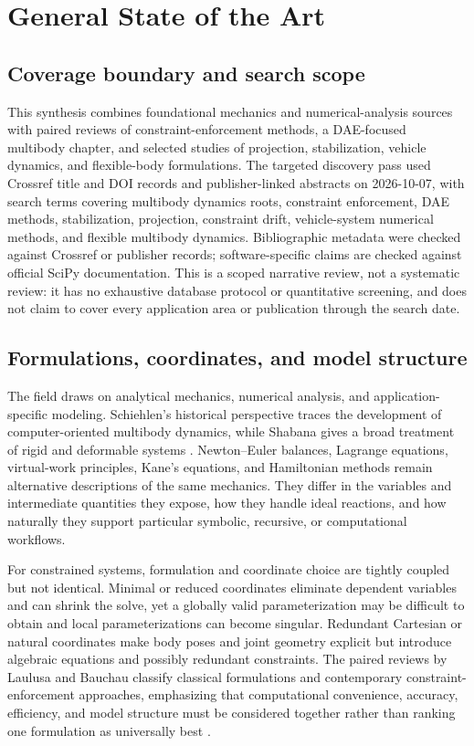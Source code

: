 \chapter*{General State of the Art}

\label{chap:general-state-of-the-art}

\section*{Coverage boundary and search scope}
This synthesis combines foundational mechanics and numerical-analysis sources with paired reviews of constraint-enforcement methods, a DAE-focused multibody chapter, and selected studies of projection, stabilization, vehicle dynamics, and flexible-body formulations. The targeted discovery pass used Crossref title and DOI records and publisher-linked abstracts on 2026-10-07, with search terms covering multibody dynamics roots, constraint enforcement, DAE methods, stabilization, projection, constraint drift, vehicle-system numerical methods, and flexible multibody dynamics. Bibliographic metadata were checked against Crossref or publisher records; software-specific claims are checked against official SciPy documentation. This is a scoped narrative review, not a systematic review: it has no exhaustive database protocol or quantitative screening, and does not claim to cover every application area or publication through the search date.

\section*{Formulations, coordinates, and model structure}
The field draws on analytical mechanics, numerical analysis, and application-specific modeling. Schiehlen's historical perspective traces the development of computer-oriented multibody dynamics, while Shabana gives a broad treatment of rigid and deformable systems \cite{schiehlen1997roots,shabana2013dynamics}. Newton--Euler balances, Lagrange equations, virtual-work principles, Kane's equations, and Hamiltonian methods remain alternative descriptions of the same mechanics. They differ in the variables and intermediate quantities they expose, how they handle ideal reactions, and how naturally they support particular symbolic, recursive, or computational workflows.

For constrained systems, formulation and coordinate choice are tightly coupled but not identical. Minimal or reduced coordinates eliminate dependent variables and can shrink the solve, yet a globally valid parameterization may be difficult to obtain and local parameterizations can become singular. Redundant Cartesian or natural coordinates make body poses and joint geometry explicit but introduce algebraic equations and possibly redundant constraints. The paired reviews by Laulusa and Bauchau classify classical formulations and contemporary constraint-enforcement approaches, emphasizing that computational convenience, accuracy, efficiency, and model structure must be considered together rather than ranking one formulation as universally best \cite{laulusa2008classical,bauchau2008contemporary}.


